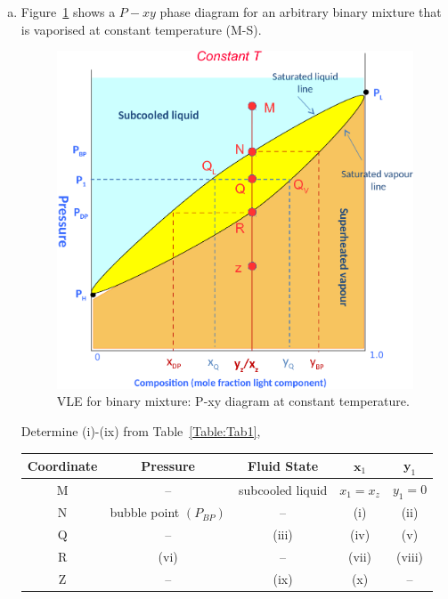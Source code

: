 \documentclass[calculator,allquestions,datasheet,solutions]{exam_newMarcus2}
\begin{document}
\begin{question}
  \begin{enumerate}[a)]
    \item Figure~\ref{Figure:Fig1} shows a $P-xy$ phase diagram for an arbitrary binary mixture that is vaporised at constant temperature (M-S).
      \begin{figure}[h]
        \begin{center}
          \includegraphics[width=.5\linewidth,clip]{./Pics/VLE_Pxy_Diagram3b}
          \caption{VLE for binary mixture: P-xy diagram at constant temperature.}\label{Figure:Fig1}
        \end{center}
      \end{figure}
      Determine (i)-(ix) from Table~\ref{Table:Tab1},
      \begin{table}[h]
        \begin{center}
          \begin{tabular}{||c| c | c | c | c ||}
            \hline\hline
            {\bf Coordinate} & {\bf Pressure} & {\bf Fluid State} & $\mathbf{x}_{1}$ & $\mathbf{y}_{1}$ \\
            \hline
                 M           &   --           &   subcooled liquid & $x_{1}=x_{z}$    & $y_{1}=0$        \\
                 N           &bubble point $\left(P_{BP}\right)$&--& (i)             & (ii)            \\
                 Q           &  --            &     (iii)          & (iv)             & (v)            \\
                 R           &  (vi)          &     --             & (vii)             & (viii)            \\
                 Z           &  --           &     (ix)            & (x)         &  --            \\                 
            \hline\hline

\end{tabular}
\end{center}
\end{table}
\end{enumerate}
\end{question}
\end{document}
